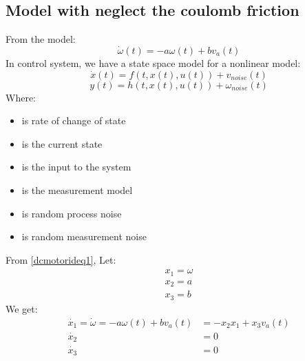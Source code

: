 \subsection{Model with neglect the coulomb friction}
	From the model:
	\begin{equation}
		\dot{\omega}(t) = - a \omega(t) + b v_a(t)
		\label{dcmotorideq1}
	\end{equation}
	In control system, we have a state space model for a nonlinear model:
	\[\dot{x}(t) = f(t,x(t),u(t)) + v_{noise}(t)\]
	\[y(t) = h(t,x(t),u(t)) + \omega_{noise}(t)\]
	Where:
	\begin{itemize}
		\item { is rate of change of state }
		\item { is the current state}
		\item { is the input to the system}
		\item { is the measurement model}
		\item { is random process noise}
		\item { is random measurement noise}
	\end{itemize}
	From \autoref{dcmotorideq1}, Let:
	\begin{equation}
		\begin{split}
			x_1 = \omega\\
			x_2 = a\\
			x_3 = b
		\end{split}
		\label{dcmotorideq2}
	\end{equation}
	We get:
	\begin{equation}
		\begin{split}
			\dot{x_1} = \dot{\omega} = - a \omega(t) + b v_a(t) &= -x_2 x_1 + x_3 v_a(t)\\
			\dot{x_2} &= 0 \\
			\dot{x_3} &= 0
		\end{split}
		\label{dcmotorideq3}
	\end{equation}
	

